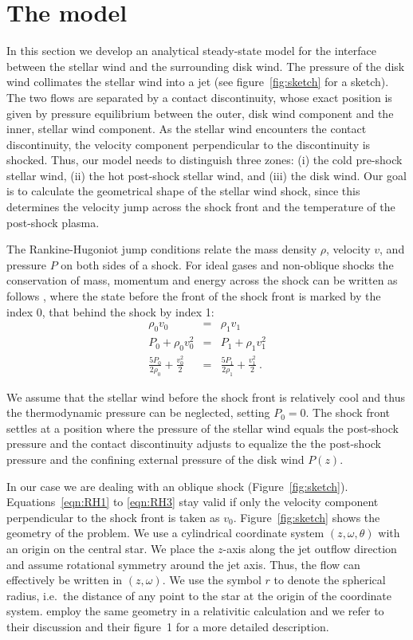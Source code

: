 \section{The model}
\label{sect:model}
In this section we develop an analytical steady-state model for the interface between the stellar wind and the surrounding disk wind. The pressure of the disk wind collimates the stellar wind into a jet (see figure~\ref{fig:sketch} for a sketch). The two flows are separated by a contact discontinuity, whose exact position is given by pressure equilibrium between the outer, disk wind component and the inner, stellar wind component. As the stellar wind encounters the contact discontinuity, the velocity component perpendicular to the discontinuity is shocked. Thus, our model needs to distinguish three zones: (i) the cold pre-shock stellar wind, (ii) the hot post-shock stellar wind, and (iii) the disk wind. Our goal is to calculate the geometrical shape of the stellar wind shock, since this determines the velocity jump across the shock front and the temperature of the post-shock plasma. 

The Rankine-Hugoniot jump conditions relate the mass density $\rho$, velocity $v$, and pressure $P$ on both sides of a shock. For ideal gases and non-oblique shocks the conservation of mass, momentum and energy across the shock can be written as follows \citep[][chap.~7]{1967pswh.book.....Z}, where the state before the front of the shock front is marked by the index 0, that behind the shock by index 1:
\begin{eqnarray}
\rho_0 v_0 & = & \rho_1 v_1 \label{eqn:RH1}\\
\label{eqn:RH2}P_0+\rho_0 v_0^2 & = & P_1+\rho_1 v_1^2\\
\label{eqn:RH3}\frac{5 P_0}{2\rho_0}+\frac{v_0^2}{2}& = &\frac{5 P_1}{2\rho_1}+\frac{v_1^2}{2} \ .
\end{eqnarray}

We assume that the stellar wind before the shock front is relatively cool and thus the thermodynamic pressure can be neglected, setting $P_0=0$.
The shock front settles at a position where the pressure of the stellar wind equals the post-shock pressure and the contact discontinuity adjusts to equalize the the post-shock pressure and the confining external pressure of the disk wind $P(z)$. 

In our case we are dealing with an oblique shock (Figure~\ref{fig:sketch}). Equations~\ref{eqn:RH1} to \ref{eqn:RH3} stay valid if only the velocity component perpendicular to the shock front is taken as $v_0$. 
Figure~\ref{fig:sketch} shows the geometry of the problem. We use a cylindrical coordinate system $(z, \omega, \theta)$ with an origin on the central star. We place the $z$-axis along the jet outflow direction and assume rotational symmetry around the jet axis. Thus, the flow can effectively be written in $(z,\omega)$. We use the symbol $r$ to denote the spherical radius, i.e.\ the distance of any point to the star at the origin of the coordinate system. 
\citet{2012MNRAS.422.2282K} employ the same geometry in a relativitic calculation and we refer to their discussion and their figure~1 for a more detailed description.

